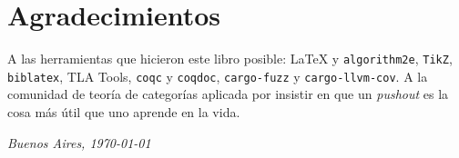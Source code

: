 \section*{Agradecimientos}

A las herramientas que hicieron este libro posible: \LaTeX{} y
\texttt{algorithm2e}, \texttt{TikZ}, \texttt{biblatex}, TLA Tools,
\texttt{coqc} y \texttt{coqdoc}, \texttt{cargo-fuzz} y \texttt{cargo-llvm-cov}.
A la comunidad de teoría de categorías aplicada por insistir en que un
\emph{pushout} es la cosa más útil que uno aprende en la vida.

\bigskip
\noindent\hfill \emph{Buenos Aires, \today}
\clearpage
